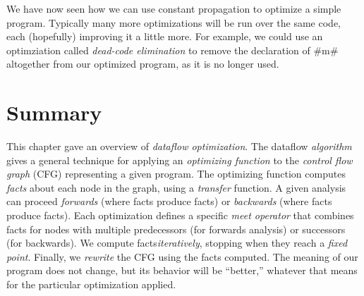 \documentclass[12pt]{report}
\begin{document}
We have now seen how we can use constant propagation to optimize a
simple program. Typically many more optimizations will be run over the
same code, each (hopefully) improving it a little more. For example,
we could use an optimziation called \emph{dead-code elimination} to
remove the declaration of #m# altogether from our optimized program,
as it is no longer used. 

\section{Summary}
\label{sec_back9}

This chapter gave an overview of \emph{dataflow optimization}. The
dataflow \emph{algorithm} gives a general technique for applying an
\emph{optimizing function} to the \emph{control flow graph} (CFG)
representing a given program. The optimizing function computes
\emph{facts} about each node in the graph, using a \emph{transfer}
function. A given analysis can proceed \emph{forwards} (where \inBa
facts produce \outBa facts) or \emph{backwards} (where \outBa facts
produce \inBa facts). Each optimization defines a specific \emph{meet
  operator} that combines facts for nodes with multiple predecessors
(for forwards analysis) or successors (for backwards). We compute
facts\emph{iteratively}, stopping when they reach a \emph{fixed
  point}. Finally, we \emph{rewrite} the CFG using the facts computed. The 
meaning of our program does not change, but its behavior will be ``better,'' 
whatever that means for the particular optimization applied.





\end{document}
